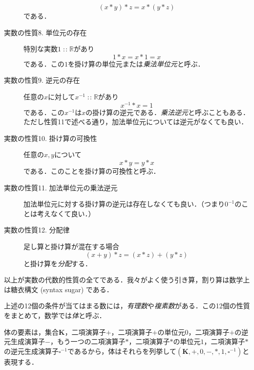 \documentclass[twocolumn]{jsbook}
\newcommand{\keyword}[1]{{\emph{#1}}}
\DeclareMathOperator{\mathIn}{:\!:}
\newcommand{\mathSomething}{\square}
\newcommand{\mathSet}[1]{\mathbf{#1}} %
\newcommand{\mathSpecialSet}[1]{\mathbb{#1}} %
\newcommand{\mathField}[7]{(#1,#2,#3,#4,#5,#6,#7)}
\begin{document}
\begin{description}
\begin{equation}
(x*y)*z=x*(y*z)
\end{equation}
である．
\item[実数の性質8. 単位元の存在] 特別な実数$1\mathIn\mathSpecialSet{R}$があり
\begin{equation}
1*x=x*1=x
\end{equation}
である．この$1$を掛け算の単位元または\keyword{乗法単位元}と呼ぶ．
\item[実数の性質9. 逆元の存在] 任意の$x$に対して$x^{-1}\mathIn\mathSpecialSet{R}$があり
\begin{equation}
x^{-1}*x=1
\end{equation}
である．この$x^{-1}$は$x$の掛け算の逆元である．\keyword{乗法逆元}と呼ぶこともある．ただし性質11で述べる通り，加法単位元については逆元がなくても良い．
\item[実数の性質10. 掛け算の可換性] 任意の$x,y$について
\begin{equation}
x*y=y*x
\end{equation}
である．このことを掛け算の可換性と呼ぶ．
\item[実数の性質11. 加法単位元の乗法逆元] 加法単位元に対する掛け算の逆元は存在しなくても良い．（つまり$0^{-1}$のことは考えなくて良い．）
\item[実数の性質12. 分配律] 足し算と掛け算が混在する場合
\begin{equation}
(x+y)*z=(x*z)+(y*z)
\end{equation}
と掛け算を\keyword{分配}する．
\end{description}
以上が実数の代数的性質の全てである．我々がよく使う引き算，割り算は数学上は糖衣構文 (syntax sugar) である．

上述の12個の条件が当てはまる数には，\keyword{有理数}や\keyword{複素数}がある．この12個の性質をまとめて，数学では\keyword{体}と呼ぶ．

体の要素は，集合$\mathSet{K}$，二項演算子$+$，二項演算子$+$の単位元$0$，二項演算子$+$の逆元生成演算子$-$，もう一つの二項演算子$*$，二項演算子$*$の単位元$1$，二項演算子$*$の逆元生成演算子$\mathSomething^{-1}$であるから，体はそれらを列挙して$\mathField{\mathSet{K}}{+}{0}{-}{*}{1}{\mathSomething^{-1}}$と表現する．
\end{document}

